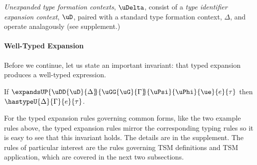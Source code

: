 \documentclass[acmlarge,review,anonymous]{acmart}\settopmatter{printfolios=true}
\begin{document}
\emph{Unexpanded type formation contexts}, $\uDelta$, consist of a \emph{type identifier expansion context}, $\uD$, paired with a standard type formation context, $\Delta$, and operate analagously (see supplement.)


\paragraph{Well-Typed Expansion} Before we continue, let us state an important invariant: that typed expansion produces a well-typed expression.
\begin{theorem}\label{thm:typed-expansion-short-U}
If $\expandsUP{\uDD{\uD}{\Delta}\hspace{-3px}}{\uGG{\uG}{\Gamma}\hspace{-3px}}{\uPsi}{\uPhi}{\ue}{e}{\tau}$ then $\hastypeU{\Delta}{\Gamma}{e}{\tau}$.
\end{theorem}
For the typed expansion rules governing common forms, like the two example rules above, the typed expansion rules mirror the corresponding typing rules so it is easy to see that this invariant holds. The details are in the supplement. The  rules of particular interest are the rules governing TSM definitions and TSM application, which are covered in the next two subsections. 

\end{document}
